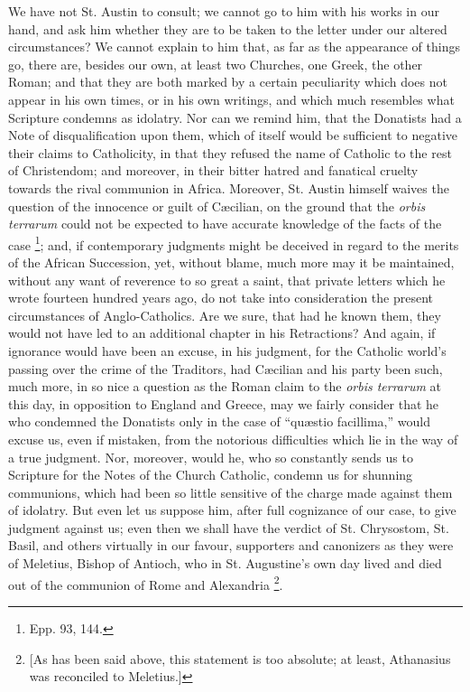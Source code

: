 We have not St. Austin to consult; we cannot go to him with his
works in our hand, and ask him whether they are to be taken to the
letter under our altered circumstances? We cannot explain to him that,
as far as the appearance of things go, there are, besides our
own, at least two Churches, one Greek, the other Roman; and that they
are both marked by a certain peculiarity which does not appear in his
own times, or in his own writings, and which much resembles what
Scripture condemns as idolatry. Nor can we remind him, that the
Donatists had a Note of disqualification upon them, which of itself
would be sufficient to negative their claims to Catholicity, in that
they refused the name of Catholic to the rest of Christendom; and
moreover, in their bitter hatred and fanatical cruelty towards the
rival communion in Africa. Moreover, St. Austin himself waives the
question of the innocence or guilt of Cæcilian, on the ground that
the \emph{orbis terrarum} could not be expected to have accurate
knowledge of the facts of the case \footnote{Epp. 93, 144.}; and, if contemporary judgments might be deceived in regard to
the merits of the African Succession, yet, without blame, much more
may it be maintained, without any want of reverence to so great a
saint, that private letters which he wrote fourteen hundred years ago,
do not take into consideration the present circumstances of
Anglo-Catholics. Are we sure, that had he known them, they would not
have led to an additional chapter in his Retractions? And again, if
ignorance would have been an excuse, in his judgment, for the Catholic
world's passing over the crime of the Traditors, had Cæcilian and his
party been such, much more, in so nice a question as the Roman claim
to the \emph{orbis terrarum} at this day, in opposition to England and
Greece, may we fairly consider that he who condemned the Donatists
only in the case of ``quæstio facillima,'' would excuse us,
even if mistaken, from the notorious difficulties which lie in the way
of a true judgment. Nor, moreover, would he, who so constantly sends us
to Scripture for the Notes of the Church Catholic, condemn us
for shunning communions, which had been so little sensitive of the
charge made against them of idolatry. But even let us suppose him,
after full cognizance of our case, to give judgment against us; even
then we shall have the verdict of St. Chrysostom, St. Basil, and
others virtually in our favour, supporters and canonizers as they were
of Meletius, Bishop of Antioch, who in St. Augustine's own day lived
and died out of the communion of Rome and Alexandria \footnote{[As has been
said above, this statement is too absolute; at least, Athanasius was
reconciled to Meletius.]}.

